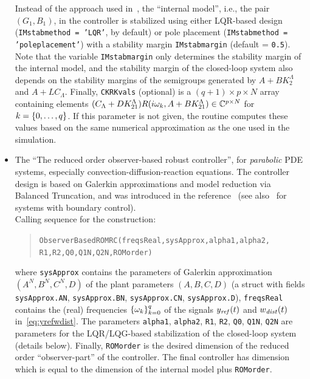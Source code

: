\documentclass[11pt, a4paper]{amsart}
\newcommand{\CL}{C_\Lambda}
\theoremstyle{definition}
\numberwithin{equation}{section}
\newcommand{\yref}{y_{\mbox{\scriptsize\textit{ref}}}}
\newcommand{\wdist}{w_{\mbox{\scriptsize\textit{dist}}}}
\begin{document}
\begin{itemize}
     Instead of the approach used in~\cite{Pau16a}, the ``internal model'', i.e., the pair $(G_1,B_1)$, in the controller is stabilized using either LQR-based design (\texttt{IMstabmethod = 'LQR'}, by default) or pole placement (\texttt{IMstabmethod = 'poleplacement'}) with a stability margin \texttt{IMstabmargin} (default = \texttt{0.5}). Note that the variable \texttt{IMstabmargin} only determines the stability margin of the internal model, and the stability margin of the closed-loop system also depends on the stability margins of the semigroups generated by $A+BK_2^\Lambda$ and $A+L\CL$.
     Finally, \texttt{CKRKvals} (optional) is a $(q+1)\times p\times N$ array containing elements $(\CL +DK_{21}^\Lambda)R(i\gw_k,A+BK_{21}^\Lambda)\in \C^{p\times N}$ for $k=\List[0]{q}$. If this parameter is not given, the routine computes these values based on the same numerical approximation as the one used in the simulation.
\item 
The ``The reduced order observer-based robust controller'', for \emph{parabolic} PDE systems, especially convection-diffusion-reaction equations. The controller design is based on Galerkin approximations and model reduction via Balanced Truncation, and was introduced in the reference~\cite{PauPha20} (see also~\cite{PhaPau21} for systems with boundary control).\\[1ex]
      Calling sequence for the construction:\\[-1ex]
     \begin{quotation}
       \hspace{-1cm}\texttt{ObserverBasedROMRC(freqsReal,sysApprox,alpha1,alpha2,\\ 
	 \phantom{a}\hspace{3.0cm} R1,R2,Q0,Q1N,Q2N,ROMorder)}
     \end{quotation}
     \medskip
     where \texttt{sysApprox} contains the parameters of Galerkin approximation $(A^N,B^N,C^N,D)$ of the plant parameters $(A,B,C,D)$ (a struct with fields \texttt{sysApprox.AN}, \texttt{sysApprox.BN}, \texttt{sysApprox.CN}, \texttt{sysApprox.D}), \texttt{freqsReal} contains the (real) frequencies $\set{\gw_k}_{k=0}^q$ of the signals $\yref(t)$ and $\wdist(t)$ in~\eqref{eq:yrefwdist}.
The parameters \texttt{alpha1}, \texttt{alpha2},
\texttt{R1}, \texttt{R2}, \texttt{Q0}, \texttt{Q1N}, \texttt{Q2N} are parameters for the LQR/LQG-based stabilization of the closed-loop system (details below). Finally, \texttt{ROMorder} is the desired dimension of the reduced order ``observer-part'' of the controller. The final controller has dimension which is equal to the dimension of the internal model plus \texttt{ROMorder}.


\end{itemize}
\end{document}
